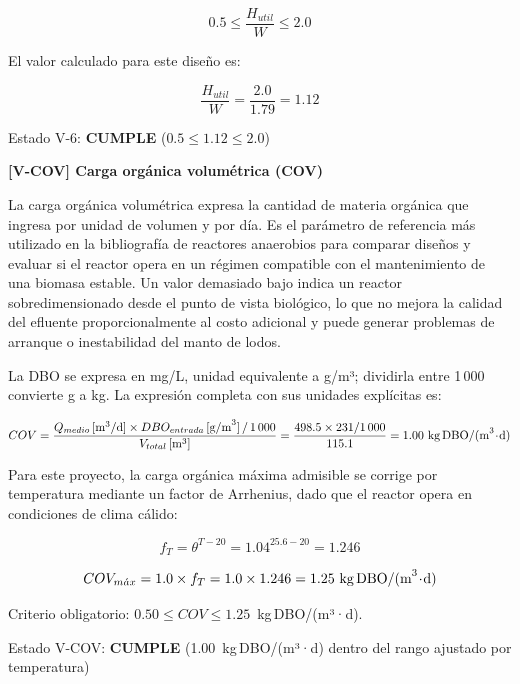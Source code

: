 \documentclass[12pt,a4paper]{article}
\begin{document}
\begin{equation}
0.5 \leq \frac{H_{util}}{W} \leq 2.0
\end{equation}

El valor calculado para este diseño es:

\begin{equation}
\frac{H_{util}}{W} = \frac{2.0}{1.79} = 1.12
\end{equation}

Estado V-6: \textbf{CUMPLE} ($0.5 \leq 1.12 \leq 2.0$)

\textbf{[V-COV] Carga orgánica volumétrica (COV)}

La carga orgánica volumétrica expresa la cantidad de materia orgánica que ingresa por unidad de volumen y por día. Es el parámetro de referencia más utilizado en la bibliografía de reactores anaerobios para comparar diseños y evaluar si el reactor opera en un régimen compatible con el mantenimiento de una biomasa estable. Un valor demasiado bajo indica un reactor sobredimensionado desde el punto de vista biológico, lo que no mejora la calidad del efluente proporcionalmente al costo adicional y puede generar problemas de arranque o inestabilidad del manto de lodos.

La DBO se expresa en mg/L, unidad equivalente a g/m³; dividirla entre 1\,000 convierte g a kg. La expresión completa con sus unidades explícitas es:

\begin{equation}
COV = \frac{Q_{medio} \,[\text{m}^3/\text{d}] \times DBO_{entrada} \,[\text{g/m}^3] \,/\, 1\,000}{V_{total} \,[\text{m}^3]} = \frac{498.5 \times 231 / 1\,000}{115.1} = 1.00 \text{ kg\,DBO/(m}^3\!\cdot\!\text{d)}
\end{equation}

Para este proyecto, la carga orgánica máxima admisible se corrige por temperatura mediante un factor de Arrhenius, dado que el reactor opera en condiciones de clima cálido:

\begin{equation}
f_T = \theta^{T - 20} = 1.04^{25.6 - 20} = 1.246
\end{equation}

\begin{equation}
COV_{m\acute{a}x} = 1.0 \times f_T = 1.0 \times 1.246 = 1.25 \text{ kg\,DBO/(m}^3\!\cdot\!\text{d)}
\end{equation}

Criterio obligatorio: $0.50 \leq COV \leq 1.25$~kg\,DBO/(m³·d).

Estado V-COV: \textbf{CUMPLE} (1.00~kg\,DBO/(m³·d) dentro del rango ajustado por temperatura)
\end{document}
